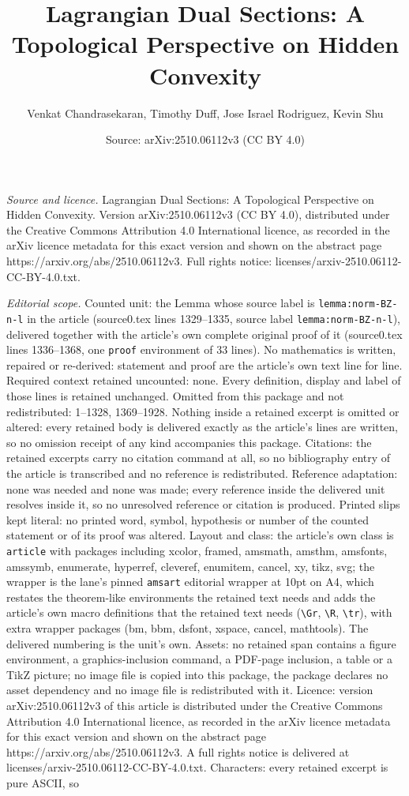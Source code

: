 \documentclass[10pt,a4paper]{amsart}
\title[Lagrangian Dual Sections: A Topological Perspective on Hidde]{Lagrangian Dual Sections: A Topological Perspective on Hidden Convexity}
\author{Venkat Chandrasekaran, Timothy Duff, Jose Israel Rodriguez, Kevin Shu}
\date{Source: arXiv:2510.06112v3 (CC BY 4.0)}
\begin{document}
\maketitle

\noindent\emph{Source and licence.} Lagrangian Dual Sections: A Topological Perspective on Hidden Convexity. Version arXiv:2510.06112v3 (CC BY 4.0), distributed under the Creative Commons Attribution 4.0 International licence, as recorded in the arXiv licence metadata for this exact version and shown on the abstract page https://arxiv.org/abs/2510.06112v3. Full rights notice: licenses/arxiv-2510.06112-CC-BY-4.0.txt.\par\smallskip

\noindent\textit{Editorial scope.} Counted unit: the Lemma whose source label is \texttt{lemma:norm-BZ-n-l} in the article (source0.tex lines 1329--1335, source label \texttt{lemma:norm-BZ-n-l}), delivered together with the article's own complete original proof of it (source0.tex lines 1336--1368, one \texttt{proof} environment of 33 lines). No mathematics is written, repaired or re-derived: statement and proof are the article's own text line for line. Required context retained uncounted: none. Every definition, display and label of those lines is retained unchanged. Omitted from this package and not redistributed: 1--1328, 1369--1928. Nothing inside a retained excerpt is omitted or altered: every retained body is delivered exactly as the article's lines are written, so no omission receipt of any kind accompanies this package. Citations: the retained excerpts carry no citation command at all, so no bibliography entry of the article is transcribed and no reference is redistributed. Reference adaptation: none was needed and none was made; every reference inside the delivered unit resolves inside it, so no unresolved reference or citation is produced. Printed slips kept literal: no printed word, symbol, hypothesis or number of the counted statement or of its proof was altered. Layout and class: the article's own class is \texttt{article} with packages including xcolor, framed, amsmath, amsthm, amsfonts, amssymb, enumerate, hyperref, cleveref, enumitem, cancel, xy, tikz, svg; the wrapper is the lane's pinned \texttt{amsart} editorial wrapper at 10pt on A4, which restates the theorem-like environments the retained text needs and adds the article's own macro definitions that the retained text needs (\texttt{\textbackslash Gr}, \texttt{\textbackslash R}, \texttt{\textbackslash tr}), with extra wrapper packages (bm, bbm, dsfont, xspace, cancel, mathtools). The delivered numbering is the unit's own. Assets: no retained span contains a figure environment, a graphics-inclusion command, a PDF-page inclusion, a table or a TikZ picture; no image file is copied into this package, the package declares no asset dependency and no image file is redistributed with it. Licence: version arXiv:2510.06112v3 of this article is distributed under the Creative Commons Attribution 4.0 International licence, as recorded in the arXiv licence metadata for this exact version and shown on the abstract page https://arxiv.org/abs/2510.06112v3. A full rights notice is delivered at licenses/arxiv-2510.06112-CC-BY-4.0.txt. Characters: every retained excerpt is pure ASCII, so 
\end{document}
